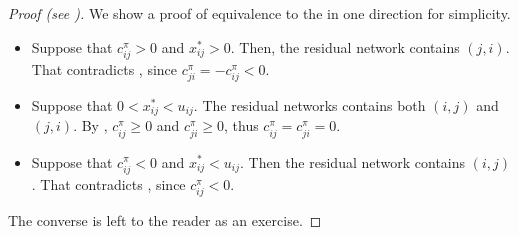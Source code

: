 \begin{proof}[Proof (see {\cite[p.310]{ahuja1993network}})]
We show a proof of equivalence to the  in one direction for simplicity. 
\begin{itemize}
    \item Suppose that $c_{ij}^\pi > 0$ and $x^*_{ij} > 0$. Then, the residual network contains $(j,i)$. That contradicts
    , since $c_{ji}^\pi = -c_{ij}^\pi < 0$.

    \item Suppose that $0 < x_{ij}^* < u_{ij}$. The residual networks contains both $(i,j)$ and $(j,i)$. By , ${c_{ij}^\pi \geq 0}$ and ${c_{ji}^\pi \geq 0}$, thus $c_{ij}^\pi = c_{ji}^\pi =0$. 

    \item Suppose that $c_{ij}^\pi < 0$ and $x^*_{ij} < u_{ij}$. Then the residual network contains $(i,j)$. That contradicts , since $c_{ij}^\pi < 0$.

    
\end{itemize}

    The converse is left to the reader as an exercise.
\end{proof}